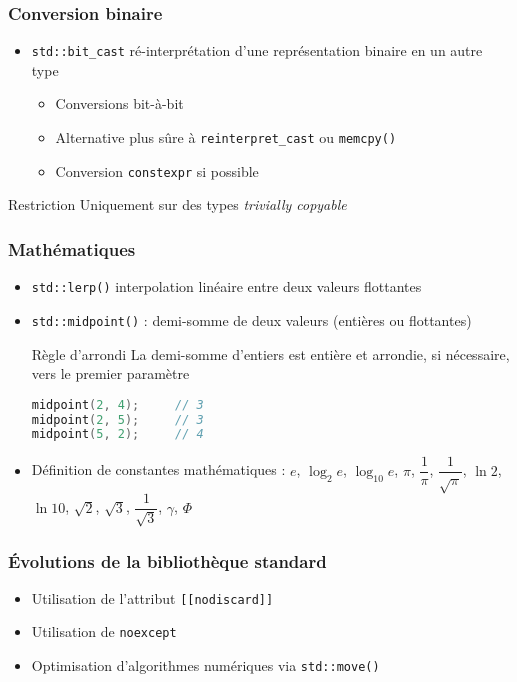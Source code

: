 \documentclass[C++.tex]{subfiles}
\begin{document}
\begin{frame}[fragile]
	\frametitle{Conversion binaire}
	\begin{itemize}
		\item \lstinline|std::bit_cast| ré-interprétation d'une représentation binaire en un autre type
		\begin{itemize}
			\item Conversions bit-à-bit
			\item Alternative plus sûre à \lstinline|reinterpret_cast| ou \lstinline|memcpy()|
			\item Conversion \lstinline|constexpr| si possible
		\end{itemize}
	\end{itemize}

	\begin{alertblock}{Restriction}
		Uniquement sur des types \textit{trivially copyable}
	\end{alertblock}
\end{frame}

\begin{frame}[fragile]
	\frametitle{Mathématiques}
	\begin{itemize}
		\item \lstinline|std::lerp()| interpolation linéaire entre deux valeurs flottantes
		\item \lstinline|std::midpoint()| : demi-somme de deux valeurs (entières ou flottantes)

		\begin{block}{Règle d'arrondi}
			La demi-somme d'entiers est entière et arrondie, si nécessaire, vers le premier paramètre
		\end{block}
		
		\begin{lstlisting}[language=C++]
midpoint(2, 4);     // 3
midpoint(2, 5);     // 3
midpoint(5, 2);     // 4\end{lstlisting}

		\item Définition de constantes mathématiques : $e$, $\log_2 e$, $\log_{10} e$, $\pi$, $\dfrac{1}{\pi}$, $\dfrac{1}{\sqrt{\pi}}$, $\ln{2}$, $\ln{10}$, $\sqrt{2}$, $\sqrt{3}$, $\dfrac{1}{\sqrt{3}}$, $\gamma$, $\Phi$

	\end{itemize}
\end{frame}

\begin{frame}[fragile]
	\frametitle{Évolutions de la bibliothèque standard}
	\begin{itemize}
		\item Utilisation de l'attribut \lstinline|[[nodiscard]]|
		\item Utilisation de \lstinline|noexcept|
		\item Optimisation d'algorithmes numériques via \lstinline|std::move()|

	\end{itemize}
\end{frame}
\end{document}
